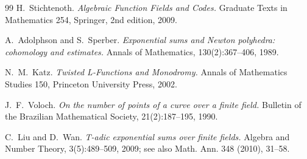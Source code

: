 \documentclass[11pt]{article}
\theoremstyle{definition}
\theoremstyle{remark}
\begin{document}
\begin{thebibliography}{99}
H.~Stichtenoth.
\emph{Algebraic Function Fields and Codes.}
Graduate Texts in Mathematics 254, Springer, 2nd edition, 2009.

A.~Adolphson and S.~Sperber.
\emph{Exponential sums and Newton polyhedra: cohomology and estimates.}
Annals of Mathematics, 130(2):367--406, 1989.

N.~M.~Katz.
\emph{Twisted L-Functions and Monodromy.}
Annals of Mathematics Studies 150, Princeton University Press, 2002.

J.~F.~Voloch.
\emph{On the number of points of a curve over a finite field.}
Bulletin of the Brazilian Mathematical Society, 21(2):187--195, 1990.

C.~Liu and D.~Wan.
\emph{T-adic exponential sums over finite fields.}
Algebra and Number Theory, 3(5):489--509, 2009; see also Math. Ann. 348 (2010), 31--58.

\end{thebibliography}
\end{document}
